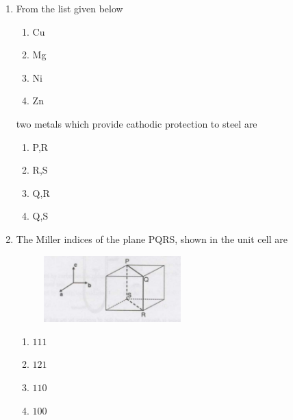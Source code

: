 \documentclass[journal]{IEEEtran}
\theoremstyle{remark}
\begin{document}
\begin{enumerate}
\begin{figure}[H]
    \caption{}
    \label{fig:placeholder}
\end{figure}
\begin{multicols}{4}
\begin{enumerate}
    \item $M1$
    \item $M2$
    \item $M3$
    \item $M4$
\end{enumerate}
\end{multicols}
\item From the list given below 
\begin{enumerate}[label=\Alph*),start = 16]
    \item Cu
    \item Mg
    \item Ni
    \item Zn
\end{enumerate}
two metals which provide cathodic protection to steel are\hfill{}
\begin{multicols}{4}
\begin{enumerate}
    \item P,R
    \item R,S
    \item Q,R
    \item Q,S
\end{enumerate}
    
\end{multicols}


\item The Miller indices of the plane PQRS, shown in the unit cell are\hfill{}
\begin{figure}[H]
    \centering
    \includegraphics[width=0.5\textwidth]{figs/Q.14.png}
    \caption{}
    \label{fig:placeholder}
\end{figure}
\begin{multicols}{4}
\begin{enumerate}
\item $111$
\item$121$
\item $110$
\item $100$
\end{enumerate}
\end{multicols}


\end{enumerate}
\end{document}
